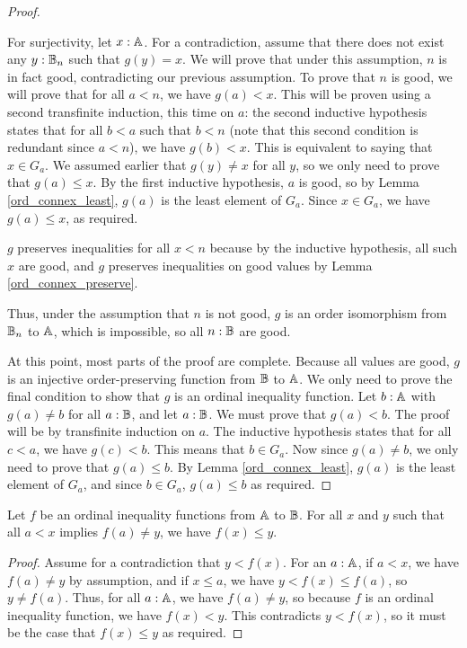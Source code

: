 \documentclass[../../math.tex]{subfiles}
\begin{document}
\begin{proof}
\begin{subproof}
        For surjectivity, let $x : \mathbb{A}$.  For a contradiction, assume that there
        does not exist any $y : \mathbb{B}_n$ such that $g(y) = x$.  We will prove that
        under this assumption, $n$ is in fact good, contradicting our previous
        assumption.  To prove that $n$ is good, we will prove that for all $a <
        n$, we have $g(a) < x$.  This will be proven using a second transfinite
        induction, this time on $a$: the second inductive hypothesis states that
        for all $b < a$ such that $b < n$ (note that this second condition is
        redundant since $a < n$), we have $g(b) < x$.  This is equivalent to
        saying that $x \in G_a$.  We assumed earlier that $g(y) \neq x$ for all
        $y$, so we only need to prove that $g(a) \leq x$.  By the first
        inductive hypothesis, $a$ is good, so by Lemma \ref{ord_connex_least},
        $g(a)$ is the least element of $G_a$.  Since $x \in G_a$, we have $g(a)
        \leq x$, as required.

        $g$ preserves inequalities for all $x < n$ because by the inductive
        hypothesis, all such $x$ are good, and $g$ preserves inequalities on
        good values by Lemma \ref{ord_connex_preserve}.

        Thus, under the assumption that $n$ is not good, $g$ is an order
        isomorphism from $\mathbb{B}_n$ to $\mathbb{A}$, which is impossible, so all $n : \mathbb{B}$
        are good.
    \end{subproof}
    At this point, most parts of the proof are complete.  Because all values are
    good, $g$ is an injective order-preserving function from $\mathbb{B}$ to $\mathbb{A}$.  We
    only need to prove the final condition to show that $g$ is an ordinal
    inequality function.  Let $b : \mathbb{A}$ with $g(a) \neq b$ for all $a : \mathbb{B}$, and
    let $a : \mathbb{B}$.  We must prove that $g(a) < b$.  The proof will be by
    transfinite induction on $a$.  The inductive hypothesis states that for all
    $c < a$, we have $g(c) < b$.  This means that $b \in G_a$.  Now since $g(a)
    \neq b$, we only need to prove that $g(a) \leq b$.  By Lemma
    \ref{ord_connex_least}, $g(a)$ is the least element of $G_a$, and since $b
    \in G_a$, $g(a) \leq b$ as required.
\end{proof}

\begin{lemma} \label{ord_le_part}
    Let $f$ be an ordinal inequality functions from $\mathbb{A}$ to $\mathbb{B}$.  For all $x$
    and $y$ such that all $a < x$ implies $f(a) \neq y$, we have $f(x) \leq y$.
\end{lemma}
\begin{proof}
    Assume for a contradiction that $y < f(x)$.  For an $a : \mathbb{A}$, if $a < x$, we
    have $f(a) \neq y$ by assumption, and if $x \leq a$, we have $y < f(x) \leq
    f(a)$, so $y \neq f(a)$.  Thus, for all $a : \mathbb{A}$, we have $f(a) \neq y$, so
    because $f$ is an ordinal inequality function, we have $f(x) < y$.  This
    contradicts $y < f(x)$, so it must be the case that $f(x) \leq y$ as
    required.
\end{proof}
\end{document}

